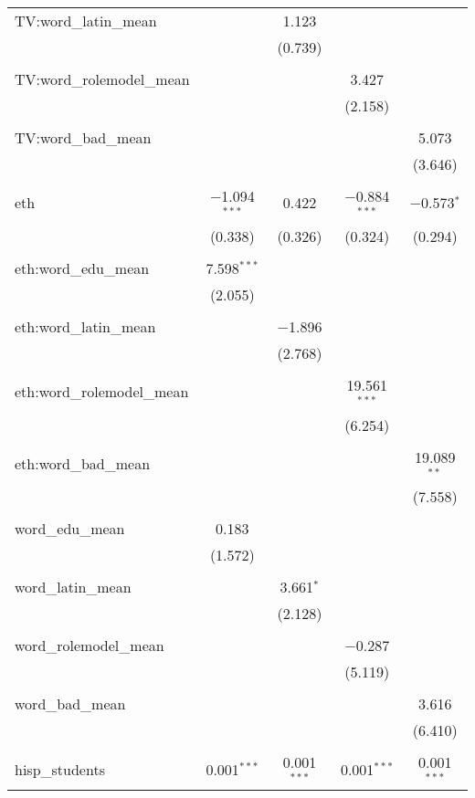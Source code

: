 \begin{table}[!htbp]
\begin{tabular}{@{\extracolsep{-2pt}}lcccc}
 TV:word\_latin\_mean &  & 1.123 &  &  \\ 
  &  & (0.739) &  &  \\ 
  & & & & \\ 
 TV:word\_rolemodel\_mean &  &  & 3.427 &  \\ 
  &  &  & (2.158) &  \\ 
  & & & & \\ 
 TV:word\_bad\_mean &  &  &  & 5.073 \\ 
  &  &  &  & (3.646) \\ 
  & & & & \\ 
 eth & $-$1.094$^{***}$ & 0.422 & $-$0.884$^{***}$ & $-$0.573$^{*}$ \\ 
  & (0.338) & (0.326) & (0.324) & (0.294) \\ 
  & & & & \\ 
 eth:word\_edu\_mean & 7.598$^{***}$ &  &  &  \\ 
  & (2.055) &  &  &  \\ 
  & & & & \\ 
 eth:word\_latin\_mean &  & $-$1.896 &  &  \\ 
  &  & (2.768) &  &  \\ 
  & & & & \\ 
 eth:word\_rolemodel\_mean &  &  & 19.561$^{***}$ &  \\ 
  &  &  & (6.254) &  \\ 
  & & & & \\ 
 eth:word\_bad\_mean &  &  &  & 19.089$^{**}$ \\ 
  &  &  &  & (7.558) \\ 
  & & & & \\ 
 word\_edu\_mean & 0.183 &  &  &  \\ 
  & (1.572) &  &  &  \\ 
  & & & & \\ 
 word\_latin\_mean &  & 3.661$^{*}$ &  &  \\ 
  &  & (2.128) &  &  \\ 
  & & & & \\ 
 word\_rolemodel\_mean &  &  & $-$0.287 &  \\ 
  &  &  & (5.119) &  \\ 
  & & & & \\ 
 word\_bad\_mean &  &  &  & 3.616 \\ 
  &  &  &  & (6.410) \\ 
  & & & & \\ 
 hisp\_students & 0.001$^{***}$ & 0.001$^{***}$ & 0.001$^{***}$ & 0.001$^{***}$ \\ 

\end{tabular}
\end{table}
